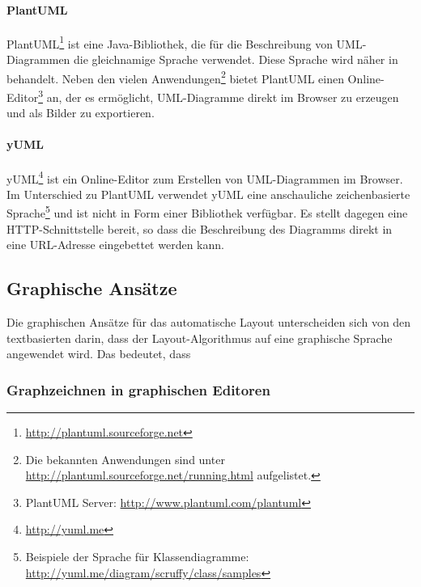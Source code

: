 \paragraph{PlantUML}


PlantUML\footnote{\url{http://plantuml.sourceforge.net}} ist eine Java-Bibliothek, die für die Beschreibung von UML-Diagrammen die gleichnamige Sprache verwendet. Diese Sprache wird näher in \cite{Roques10Drawing} behandelt. Neben den vielen Anwendungen\footnote{Die bekannten Anwendungen sind unter \url{http://plantuml.sourceforge.net/running.html} aufgelistet.} bietet PlantUML einen Online-Editor\footnote{PlantUML Server: \url{http://www.plantuml.com/plantuml}} an, der es ermöglicht, UML-Diagramme direkt im Browser zu erzeugen und als Bilder zu exportieren.

\paragraph{yUML}

yUML\footnote{\url{http://yuml.me}} ist ein Online-Editor zum Erstellen von UML-Diagrammen im Browser. Im Unterschied zu PlantUML verwendet yUML eine anschauliche zeichenbasierte Sprache\footnote{Beispiele der Sprache für Klassendiagramme: \url{http://yuml.me/diagram/scruffy/class/samples}} und ist nicht in Form einer Bibliothek verfügbar. Es stellt dagegen eine HTTP-Schnittstelle bereit, so dass die Beschreibung des Diagramms direkt in eine URL-Adresse eingebettet werden kann.

\subsection{Graphische Ansätze}
\label{subsec:automatic-layout-graphical-approaches}


Die graphischen Ansätze für das automatische Layout unterscheiden sich von den textbasierten darin, dass der Layout-Algorithmus auf eine graphische Sprache angewendet wird. Das bedeutet, dass 




\subsubsection{Graphzeichnen in graphischen Editoren}

